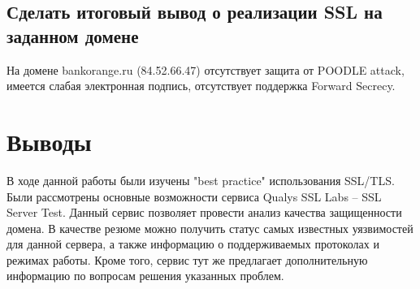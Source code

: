 \documentclass[12pt,a4paper]{article}
\begin{document}
\subsection{Сделать итоговый вывод о реализации SSL на заданном домене}
На домене bankorange.ru (84.52.66.47) отсутствует защита от POODLE attack, имеется слабая электронная подпись, отсутствует поддержка Forward Secrecy.

\section{Выводы}

В ходе данной работы были изучены "best practice" использования SSL/TLS. Были рассмотрены основные возможности сервиса Qualys SSL Labs – SSL Server Test. Данный сервис позволяет провести анализ качества защищенности домена. В качестве резюме можно получить статус самых известных уязвимостей для данной сервера, а также информацию о поддерживаемых протоколах и режимах работы. Кроме того, сервис тут же предлагает дополнительную информацию по вопросам решения указанных проблем. 
\end{document}
